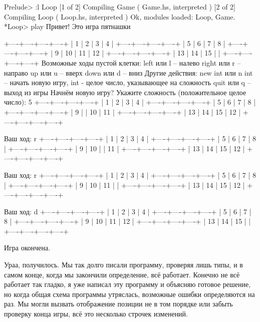 \begin{code}
Prelude> :l Loop
[1 of 2] Compiling Game             ( Game.hs, interpreted )
[2 of 2] Compiling Loop             ( Loop.hs, interpreted )
Ok, modules loaded: Loop, Game.
*Loop> play
Привет! Это игра пятнашки

	+----+----+----+----+
	|  1 |  2 |  3 |  4 |
	+----+----+----+----+
	|  5 |  6 |  7 |  8 |
	+----+----+----+----+
	|  9 | 10 | 11 | 12 |
	+----+----+----+----+
	| 13 | 14 | 15 |    |
	+----+----+----+----+
Возможные ходы пустой клетки:
   left     или l       -- налево
   right    или r       -- направо
   up       или u       -- вверх
   down     или d       -- вниз
Другие действия:
   new int  или n int -- начать новую игру, int - целое число,
указывающее на сложность
   quit     или q      -- выход из игры
Начнём новую игру?
Укажите сложность (положительное целое число): 
5
	+----+----+----+----+
	|  1 |  2 |  3 |  4 |
	+----+----+----+----+
	|  5 |  6 |  7 |  8 |
	+----+----+----+----+
	|  9 |    | 10 | 11 |
	+----+----+----+----+
	| 13 | 14 | 15 | 12 |
	+----+----+----+----+

Ваш ход: 
r
	+----+----+----+----+
	|  1 |  2 |  3 |  4 |
	+----+----+----+----+
	|  5 |  6 |  7 |  8 |
	+----+----+----+----+
	|  9 | 10 |    | 11 |
	+----+----+----+----+
	| 13 | 14 | 15 | 12 |
	+----+----+----+----+

Ваш ход: 
r
	+----+----+----+----+
	|  1 |  2 |  3 |  4 |
	+----+----+----+----+
	|  5 |  6 |  7 |  8 |
	+----+----+----+----+
	|  9 | 10 | 11 |    |
	+----+----+----+----+
	| 13 | 14 | 15 | 12 |
	+----+----+----+----+

Ваш ход: 
d
	+----+----+----+----+
	|  1 |  2 |  3 |  4 |
	+----+----+----+----+
	|  5 |  6 |  7 |  8 |
	+----+----+----+----+
	|  9 | 10 | 11 | 12 |
	+----+----+----+----+
	| 13 | 14 | 15 |    |
	+----+----+----+----+

Игра окончена.
\end{code}

Ураа, получилось. Мы так долго писали программу, проверяя лишь типы,
и в самом конце, когда мы закончили определение, всё работает.
Конечно не всё работает так гладко, я уже написал эту программу
и объясняю готовое решение, но когда общая схема программы 
утряслась, возможные ошибки определяются на раз. Мы могли вызвать
отображение позиции не в том порядке или забыть проверку 
конца игры, всё это несколько строчек изменений. 

